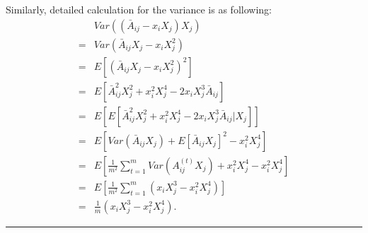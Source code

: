 \documentclass[a4paper]{article}
\newenvironment{proof}{{\bf Proof:  }}{\hfill\rule{2mm}{2mm}}
\begin{document}
\begin{proof}
Similarly, detailed calculation for the variance is as following:
\begin{align*}
	& Var \left( (\bar{A}_{ij} - x_i X_j) X_j \right) \\
    = & Var \left(\bar{A}_{ij} X_j - x_i X_j^2 \right) \\
    = & E \left[ \left( \bar{A}_{ij} X_j - x_i X_j^2 \right)^2 \right] \\
    = & E \left[ \bar{A}_{ij}^2 X_j^2 + x_i^2 X_j^4 - 2 x_i X_j^3 \bar{A}_{ij} \right] \\
    = & E \left[ E \left[ \bar{A}_{ij}^2 X_j^2 + x_i^2 X_j^4 - 2 x_i X_j^3 \bar{A}_{ij} | X_j \right] \right] \\
    = & E \left[ Var(\bar{A}_{ij} X_j) + E[\bar{A}_{ij} X_j]^2 - x_i^2 X_j^4 \right] \\
    = & E \left[ \frac{1}{m^2} \sum_{t=1}^m Var(A_{ij}^{(t)} X_j) + x_i^2 X_j^4 - x_i^2 X_j^4 \right] \\
    = & E \left[ \frac{1}{m^2} \sum_{t=1}^m (x_i X_j^3 - x_i^2 X_j^4) \right] \\
    = & \frac{1}{m} (x_i X_j^3 - x_i^2 X_j^4).
\end{align*}



\end{proof}
\end{document}
